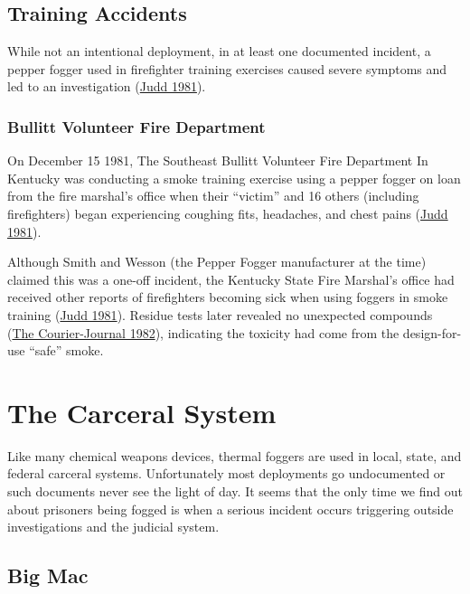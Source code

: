 \documentclass[
  11pt,
]{krantz}
\begin{document}
\hypertarget{training-accidents}{%
\section{Training Accidents}\label{training-accidents}}

While not an intentional deployment, in at least one documented incident, a pepper fogger used in firefighter training exercises caused severe symptoms and led to an investigation (\protect\hyperlink{ref-Judd1981}{Judd 1981}).

\hypertarget{bullitt-volunteer-fire-department}{%
\subsection{Bullitt Volunteer Fire Department}\label{bullitt-volunteer-fire-department}}

On December 15 1981, The Southeast Bullitt Volunteer Fire Department In Kentucky was conducting a smoke training exercise using a pepper fogger on loan from the fire marshal's office when their ``victim'' and 16 others (including firefighters) began experiencing coughing fits, headaches, and chest pains (\protect\hyperlink{ref-Judd1981}{Judd 1981}).

Although Smith and Wesson (the Pepper Fogger manufacturer at the time) claimed this was a one-off incident, the Kentucky State Fire Marshal's office had received other reports of firefighters becoming sick when using foggers in smoke training (\protect\hyperlink{ref-Judd1981}{Judd 1981}).
Residue tests later revealed no unexpected compounds (\protect\hyperlink{ref-TheCourierJournal1982_01_10}{The Courier-Journal 1982}), indicating the toxicity had come from the design-for-use ``safe'' smoke.

\hypertarget{CarceralSystem}{%
\chapter{The Carceral System}\label{CarceralSystem}}

Like many chemical weapons devices, thermal foggers are used in local, state, and federal carceral systems.
Unfortunately most deployments go undocumented or such documents never see the light of day.
It seems that the only time we find out about prisoners being fogged is when a serious incident occurs triggering outside investigations and the judicial system.

\hypertarget{BigMac}{%
\section{Big Mac}\label{BigMac}}
\end{document}
